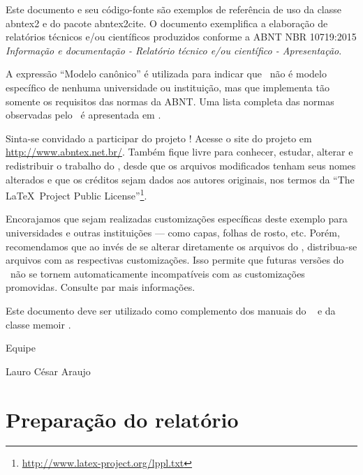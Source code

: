 \documentclass[
12pt,				%
openright,			%
twoside,			%
a4paper,			%
english,			%
french,				%
spanish,			%
brazil,				%
]{abntex2}
\begin{document}
	Este documento e seu código-fonte são exemplos de referência de uso da classe
	\textsf{abntex2} e do pacote \textsf{abntex2cite}. O documento 
	exemplifica a elaboração de relatórios técnicos e/ou científicos produzidos
	conforme a ABNT NBR 10719:2015 \emph{Informação e documentação - Relatório
		técnico e/ou científico - Apresentação}.
	
	A expressão ``Modelo canônico'' é utilizada para indicar que \abnTeX\ não é
	modelo específico de nenhuma universidade ou instituição, mas que implementa tão
	somente os requisitos das normas da ABNT. Uma lista completa das normas
	observadas pelo \abnTeX\ é apresentada em .
	
	Sinta-se convidado a participar do projeto \abnTeX! Acesse o site do projeto em
	\url{http://www.abntex.net.br/}. Também fique livre para conhecer,
	estudar, alterar e redistribuir o trabalho do \abnTeX, desde que os arquivos
	modificados tenham seus nomes alterados e que os créditos sejam dados aos
	autores originais, nos termos da ``The \LaTeX\ Project Public
	License''\footnote{\url{http://www.latex-project.org/lppl.txt}}.
	
	Encorajamos que sejam realizadas customizações específicas deste exemplo para
	universidades e outras instituições --- como capas, folhas de rosto, etc.
	Porém, recomendamos que ao invés de se alterar diretamente os arquivos do
	\abnTeX, distribua-se arquivos com as respectivas customizações.
	Isso permite que futuras versões do \abnTeX~não se tornem automaticamente
	incompatíveis com as customizações promovidas. Consulte
	 par mais informações.
	
	Este documento deve ser utilizado como complemento dos manuais do \abnTeX\ 
	\cite{abntex2classe,abntex2cite,abntex2cite-alf} e da classe \textsf{memoir}
	\cite{memoir}. 
	
	Equipe \abnTeX 
	
	Lauro César Araujo
	
	\part{Preparação do relatório}
	
	
\end{document}
